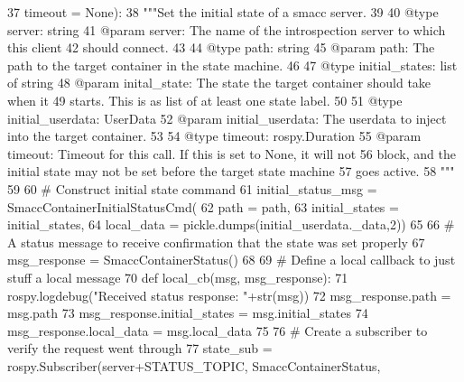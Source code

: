 \begin{DoxyCode}
37             timeout = \textcolor{keywordtype}{None}):
38         \textcolor{stringliteral}{"""Set the initial state of a smacc server.}
39 \textcolor{stringliteral}{        }
40 \textcolor{stringliteral}{        @type server: string}
41 \textcolor{stringliteral}{        @param server: The name of the introspection server to which this client}
42 \textcolor{stringliteral}{        should connect.}
43 \textcolor{stringliteral}{}
44 \textcolor{stringliteral}{        @type path: string}
45 \textcolor{stringliteral}{        @param path: The path to the target container in the state machine.}
46 \textcolor{stringliteral}{}
47 \textcolor{stringliteral}{        @type initial\_states: list of string}
48 \textcolor{stringliteral}{        @param inital\_state: The state the target container should take when it}
49 \textcolor{stringliteral}{        starts. This is as list of at least one state label.}
50 \textcolor{stringliteral}{}
51 \textcolor{stringliteral}{        @type initial\_userdata: UserData}
52 \textcolor{stringliteral}{        @param initial\_userdata: The userdata to inject into the target container.}
53 \textcolor{stringliteral}{}
54 \textcolor{stringliteral}{        @type timeout: rospy.Duration}
55 \textcolor{stringliteral}{        @param timeout: Timeout for this call. If this is set to None, it will not}
56 \textcolor{stringliteral}{        block, and the initial state may not be set before the target state machine}
57 \textcolor{stringliteral}{        goes active.}
58 \textcolor{stringliteral}{        """}
59 
60         \textcolor{comment}{# Construct initial state command}
61         initial\_status\_msg = SmaccContainerInitialStatusCmd(
62                 path = path,
63                 initial\_states = initial\_states,
64                 local\_data = pickle.dumps(initial\_userdata.\_data,2))
65 
66         \textcolor{comment}{# A status message to receive confirmation that the state was set properly}
67         msg\_response = SmaccContainerStatus()
68 
69         \textcolor{comment}{# Define a local callback to just stuff a local message}
70         \textcolor{keyword}{def }local\_cb(msg, msg\_response):
71             rospy.logdebug(\textcolor{stringliteral}{"Received status response: "}+str(msg))
72             msg\_response.path = msg.path
73             msg\_response.initial\_states = msg.initial\_states
74             msg\_response.local\_data = msg.local\_data
75 
76         \textcolor{comment}{# Create a subscriber to verify the request went through}
77         state\_sub = rospy.Subscriber(server+STATUS\_TOPIC, SmaccContainerStatus,

\end{DoxyCode}
